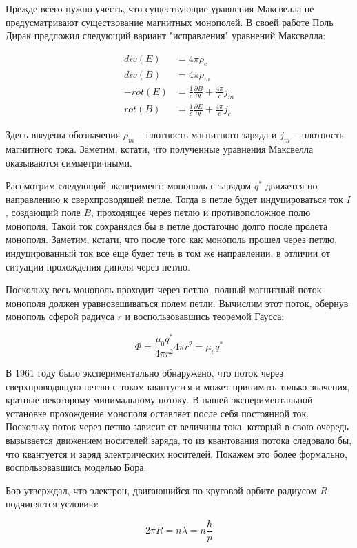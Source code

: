 \documentclass[a4paper, 12pt]{article}
\begin{document}
Прежде всего нужно учесть, что существующие уравнения Максвелла не предусматривают существование магнитных монополей. В своей работе Поль Дирак предложил следующий вариант "исправления" уравнений Максвелла:

\begin{align*}
    div(E) &= 4\pi\rho_e \\
    div(B) &= 4 \pi \rho_m \\
    -rot(E) &= \frac{1}{c} \frac{\partial B}{\partial t} + \frac{4\pi}{c}j_m \\
    rot(B) &= \frac{1}{c} \frac{\partial E}{\partial t} + \frac{4\pi}{c}j_e 
\end{align*}

Здесь введены обозначения $\rho_m$ -- плотность магнитного заряда и $j_m$ -- плотность магнитного тока. Заметим, кстати, что полученные уравнения Максвелла оказываются симметричными.

Рассмотрим следующий эксперимент: монополь с зарядом $q^*$ движется по направлению к сверхпроводящей петле. Тогда в петле будет индуцироваться ток $I$, создающий поле $B$, проходящее через петлю и противоположное полю монополя. Такой ток сохранялся бы в петле достаточно долго после пролета монополя. Заметим, кстати, что после того как монополь прошел через петлю, индуцированный ток все еще будет течь в том же направлении, в отличии от ситуации прохождения диполя через петлю. 

Поскольку весь монополь проходит через петлю, полный магнитный поток монополя должен уравновешиваться полем петли. Вычислим этот поток, обернув монополь сферой радиуса $r$ и воспользовавшись теоремой Гаусса:

\[
    \Phi = \frac{\mu_0 q^*}{4 \pi r^2}4\pi r^2 = \mu_o q^*
\]

В 1961 году было экспериментально обнаружено, что поток через сверхпроводящую петлю с током квантуется и может принимать только значения, кратные некоторому минимальному потоку. В нашей экспериментальной установке прохождение монополя оставляет после себя постоянной ток. Поскольку поток через петлю зависит от величины тока, который в свою очередь вызывается движением носителей заряда, то из квантования потока следовало бы, что квантуется и заряд электрических носителей. Покажем это более формально, воспользовавшись моделью Бора. 

Бор утверждал, что электрон, двигающийся по круговой орбите радиусом $R$ подчиняется условию:

\[
    2\pi R = n \lambda = n \frac{\hbar}{p}  
\]
\end{document}
